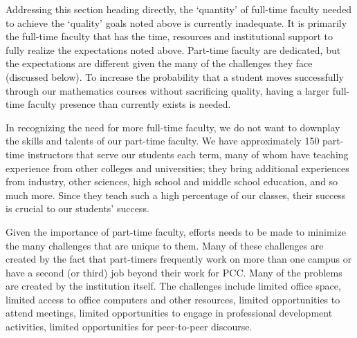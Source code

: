 Addressing this section heading directly, the `quantity' of full-time faculty needed to achieve the `quality' goals noted above is currently inadequate.
It is primarily the full-time faculty that has the time, resources and institutional support to fully realize the expectations noted above.
Part-time faculty are dedicated, but the expectations are different given the many of the challenges they face (discussed below).
To increase the probability that a student moves successfully through our mathematics courses without sacrificing quality, having a larger full-time faculty presence than currently exists is needed.

In recognizing the need for more full-time faculty, we do not want to downplay the skills and talents of our part-time faculty.
We have approximately 150 part-time instructors that serve our students each term, many of whom have teaching experience from other colleges and universities; they bring additional experiences from industry, other sciences, high school and middle school education, and so much more.
Since they teach such a high percentage of our classes, their success is crucial to our students' success.

Given the importance of part-time faculty, efforts needs to be made to minimize the many challenges that are unique to them.
Many of these challenges are created by the fact that part-timers frequently work on more than one campus or have a second (or third) job beyond their work for PCC.
Many of the problems are created by the institution itself.
The challenges include limited office space, limited access to office computers and other resources, limited opportunities to attend meetings, limited opportunities to engage in professional development activities, limited opportunities for peer-to-peer discourse.



